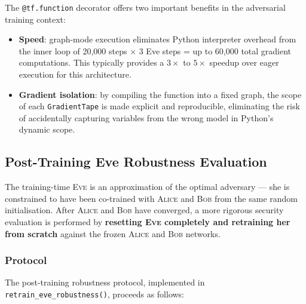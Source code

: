 \documentclass[12pt, a4paper]{article}
\newcommand{\alice}{\textsc{Alice}}
\newcommand{\bob}{\textsc{Bob}}
\newcommand{\eve}{\textsc{Eve}}
\newcommand{\code}[1]{\texttt{\color{CodeRed}#1}}
\begin{document}
The \code{@tf.function} decorator offers two important benefits in the
adversarial training context:

\begin{itemize}[leftmargin=1.8em, itemsep=4pt]
  \item \textbf{Speed}: graph-mode execution eliminates Python interpreter
        overhead from the inner loop of 20{,}000 steps $\times$ 3 Eve steps
        = up to 60{,}000 total gradient computations. This typically
        provides a $3\times$ to $5\times$ speedup over eager execution
        for this architecture.
  \item \textbf{Gradient isolation}: by compiling the function into a
        fixed graph, the scope of each \code{GradientTape} is made
        explicit and reproducible, eliminating the risk of accidentally
        capturing variables from the wrong model in Python's dynamic
        scope.
\end{itemize}

\subsection{Post-Training Eve Robustness Evaluation}
\label{subsec:post_training_eve}

The training-time \eve{} is an approximation of the optimal adversary
--- she is constrained to have been co-trained with \alice{} and \bob{}
from the same random initialisation. After \alice{} and \bob{} have
converged, a more rigorous security evaluation is performed by
\textbf{resetting \eve{} completely and retraining her from scratch}
against the frozen \alice{} and \bob{} networks.

\subsubsection*{Protocol}

The post-training robustness protocol, implemented in
\code{retrain\_eve\_robustness()}, proceeds as follows:
\end{document}
